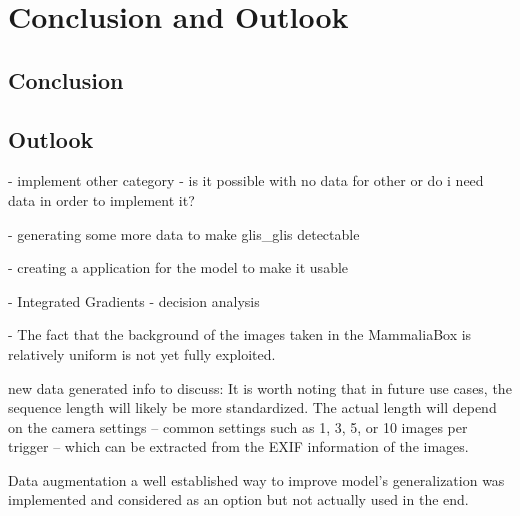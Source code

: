 


\section{Conclusion and Outlook}
\label{conclusion_outlook}

    \subsection{Conclusion}

    \subsection{Outlook}
    - implement other category - is it possible with no data for other or do i need data in order to implement it?

    - generating some more data to make glis\_glis detectable

    - creating a application for the model to make it usable

    - Integrated Gradients - decision analysis

    - The fact that the background of the images taken in the MammaliaBox is relatively uniform is not yet fully exploited.
    


    new data generated info to discuss:
    It is worth noting that in future use cases, the sequence length will likely be more standardized.
    The actual length will depend on the camera settings -- common settings such as 1, 3, 5, or 10 images per trigger -- which can be extracted from the EXIF information of the images.

    Data augmentation a well established way to improve model's generalization \autocite{shortenSurveyImageData2019} was implemented and considered as an option but not actually used in the end.